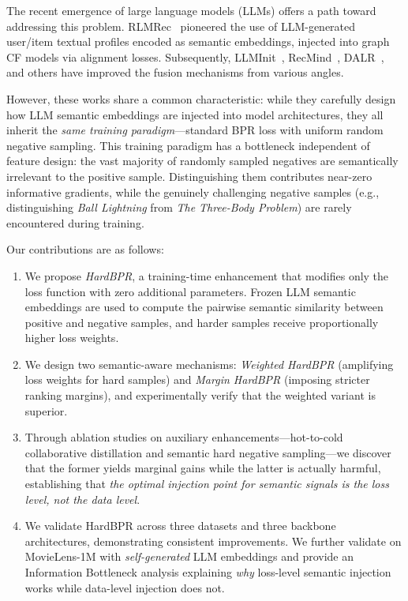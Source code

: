 \documentclass[11pt,a4paper]{article}
\begin{document}
The recent emergence of large language models (LLMs) offers a path toward addressing this problem. RLMRec~\cite{Ren2024RLMRec} pioneered the use of LLM-generated user/item textual profiles encoded as semantic embeddings, injected into graph CF models via alignment losses. Subsequently, LLMInit~\cite{Zhang2025LLMInit}, RecMind~\cite{Xue2026RecMind}, DALR~\cite{Peng2024DALR}, and others have improved the fusion mechanisms from various angles.

However, these works share a common characteristic: while they carefully design how LLM semantic embeddings are injected into model architectures, they all inherit the \emph{same training paradigm}---standard BPR loss with uniform random negative sampling. This training paradigm has a bottleneck independent of feature design: the vast majority of randomly sampled negatives are semantically irrelevant to the positive sample. Distinguishing them contributes near-zero informative gradients, while the genuinely challenging negative samples (e.g., distinguishing \emph{Ball Lightning} from \emph{The Three-Body Problem}) are rarely encountered during training.

Our contributions are as follows:
\begin{enumerate}
    \item We propose \emph{HardBPR}, a training-time enhancement that modifies only the loss function with zero additional parameters. Frozen LLM semantic embeddings are used to compute the pairwise semantic similarity between positive and negative samples, and harder samples receive proportionally higher loss weights.
    \item We design two semantic-aware mechanisms: \emph{Weighted HardBPR} (amplifying loss weights for hard samples) and \emph{Margin HardBPR} (imposing stricter ranking margins), and experimentally verify that the weighted variant is superior.
    \item Through ablation studies on auxiliary enhancements---hot-to-cold collaborative distillation and semantic hard negative sampling---we discover that the former yields marginal gains while the latter is actually harmful, establishing that \emph{the optimal injection point for semantic signals is the loss level, not the data level}.
    \item We validate HardBPR across three datasets and three backbone architectures, demonstrating consistent improvements. We further validate on MovieLens-1M with \emph{self-generated} LLM embeddings and provide an Information Bottleneck analysis explaining \emph{why} loss-level semantic injection works while data-level injection does not.
\end{enumerate}
\end{document}
